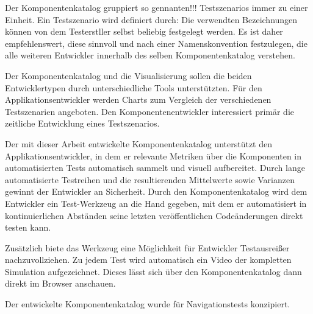 Der Komponentenkatalog gruppiert so gennanten!!! Testszenarios immer zu einer Einheit. Ein Testszenario wird definiert durch:
Die verwendten Bezeichnungen können von dem Testerstller selbst beliebig festgelegt werden. Es ist daher empfehlenswert, diese sinnvoll und nach einer Namenskonvention festzulegen, die alle weiteren Entwickler innerhalb des selben Komponentenkatalog verstehen.

Der Komponentenkatalog und die Visualisierung sollen die beiden Entwicklertypen durch unterschiedliche Tools unterstützten. Für den Applikationsentwickler werden Charts zum Vergleich der verschiedenen Testszenarien angeboten. Den Komponentenentwickler interessiert primär die zeitliche Entwicklung eines Testszenarios. 

    Der mit dieser Arbeit entwickelte Komponentenkatalog unterstützt den Applikationsentwickler, in dem er relevante Metriken über die Komponenten in automatisierten Tests automatisch sammelt und visuell aufbereitet. Durch lange automatisierte Testreihen und die resultierenden Mittelwerte sowie Varianzen gewinnt der Entwickler an Sicherheit.
    Durch den Komponentenkatalog wird dem Entwickler ein Test-Werkzeug an die Hand gegeben, mit dem er automatisiert in kontinuierlichen Abständen seine letzten veröffentlichen Codeänderungen direkt testen kann. 

    Zusätzlich biete das Werkzeug eine Möglichkeit für Entwickler Testausreißer nachzuvollziehen. Zu jedem Test wird automatisch ein Video der kompletten Simulation aufgezeichnet. Dieses lässt sich über den Komponentenkatalog dann direkt im Browser anschauen.

Der entwickelte Komponentenkatalog wurde für Navigationstests konzipiert. 
